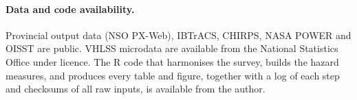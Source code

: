 \documentclass[11pt,a4paper]{article}
\begin{document}
\paragraph{Data and code availability.} Provincial output data (NSO PX-Web), IBTrACS, CHIRPS, NASA POWER and OISST are public. VHLSS microdata are available from the National Statistics Office under licence. The R code that harmonises the survey, builds the hazard measures, and produces every table and figure, together with a log of each step and checksums of all raw inputs, is available from the author.
\end{document}
